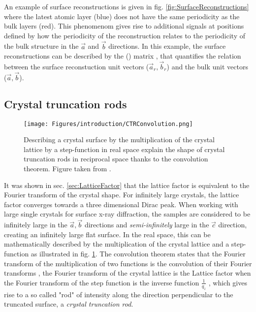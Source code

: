 An example of surface reconstructions is given in fig. \ref{fig:SurfaceReconstructions} where the latest atomic layer (blue) does not have the same periodicity as the bulk layers (red).
This phenomenom gives rise to additional signals at positions defined by how the periodicity of the reconstruction relates to the periodicity of the bulk structure in the $\vec{a}$ and $\vec{b}$ directions.
In this example, the surface reconstructions can be described by the () matrix \parencite{Wood1964}, that quantifies the relation between the surface reconstuction unit vectors ($\vec{a}_r, \vec{b}_r$) and the bulk unit vectors ($\vec{a}, \vec{b}$).

\subsection{Crystal truncation rods} \label{sec:CTR}

\begin{figure}[!htb]
    \centering
    \texttt{[image: Figures/introduction/CTRConvolution.png]}
    \caption{
    Describing a crystal surface by the multiplication of the crystal lattice by a step-function in real space explain the shape of crystal truncation rods in reciprocal space thanks to the convolution theorem.
    Figure taken from \cite{Willmott}.
    }
    \label{fig:CTRConvolution}
\end{figure}

It was shown in sec. \ref{sec:LatticeFactor} that the lattice factor is equivalent to the Fourier transform of the crystal shape.
For infinitely large crystals, the lattice factor converges towards a three dimensional Dirac peak.
When working with large single crystals for surface x-ray diffraction, the samples are considered to be infinitely large in the $\vec{a}, \vec{b}$ directions and \textit{semi-infinitely} large in the $\vec{c}$ direction, creating an infinitely large flat surface.
In the real space, this can be mathematically described by the multiplication of the crystal lattice and a step-function as illustrated in fig. \ref{fig:CTRConvolution}.
The convolution theorem states that the Fourier transform of the multiplication of two functions is the convolution of their Fourier transforms \parencite{MCALISTER2003629}, the Fourier transform of the crystal lattice is the Lattice factor when the Fourier transform of the step function is the inverse function $\frac{1}{q_z}$ \parencite{Andrews1985, Robinson1986}, which gives rise to a so called "rod" of intensity along the direction perpendicular to the truncated surface, a \textit{crystal truncation rod}.

